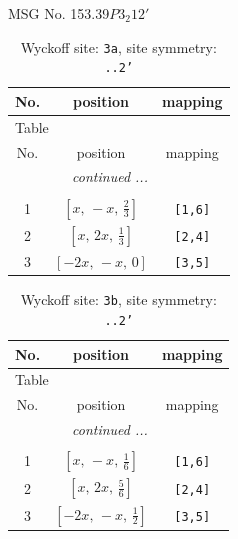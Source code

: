 \documentclass[fleqn,8pt]{jsarticle}
\begin{document}
\setcounter{MaxMatrixCols}{32}

\renewcommand{\tablename}{Table~}
\renewcommand{\figurename}{Figure~}
\begin{center}
\LARGE
MSG No. 153.39\quad$P3_{2}12'$
\end{center}
\renewcommand{\arraystretch}{1.2}
\begin{longtable}{ccc}
\caption{Wyckoff site: {\tt 3a}, site symmetry: {\tt ..2'}}
 \\
 \hline \hline
No. & position & mapping \\ \hline \endfirsthead

\multicolumn{2}{l}{\tablename\ \thetable{}} \\
 \hline \hline
No. & position & mapping \\ \hline \endhead

 \hline \hline
\multicolumn{2}{r}{\footnotesize\it continued ...} \\ \endfoot

 \hline \hline
\multicolumn{2}{r}{} \\ \endlastfoot

1 & $\left[ x,\, - x,\, \frac{2}{3} \right]$ & {\tt [1,6]} \\ \hline
2 & $\left[ x,\, 2 x,\, \frac{1}{3} \right]$ & {\tt [2,4]} \\ \hline
3 & $\left[ - 2 x,\, - x,\, 0 \right]$ & {\tt [3,5]} \\
\end{longtable}
\renewcommand{\arraystretch}{1.2}
\begin{longtable}{ccc}
\caption{Wyckoff site: {\tt 3b}, site symmetry: {\tt ..2'}}
 \\
 \hline \hline
No. & position & mapping \\ \hline \endfirsthead

\multicolumn{2}{l}{\tablename\ \thetable{}} \\
 \hline \hline
No. & position & mapping \\ \hline \endhead

 \hline \hline
\multicolumn{2}{r}{\footnotesize\it continued ...} \\ \endfoot

 \hline \hline
\multicolumn{2}{r}{} \\ \endlastfoot

1 & $\left[ x,\, - x,\, \frac{1}{6} \right]$ & {\tt [1,6]} \\ \hline
2 & $\left[ x,\, 2 x,\, \frac{5}{6} \right]$ & {\tt [2,4]} \\ \hline
3 & $\left[ - 2 x,\, - x,\, \frac{1}{2} \right]$ & {\tt [3,5]} \\
\end{longtable}
\end{document}
